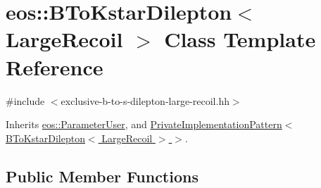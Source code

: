 \hypertarget{classeos_1_1BToKstarDilepton_3_01LargeRecoil_01_4}{
\section{eos::BToKstarDilepton$<$ LargeRecoil $>$ Class Template Reference}
\label{classeos_1_1BToKstarDilepton_3_01LargeRecoil_01_4}
}


{\ttfamily \#include $<$exclusive-\/b-\/to-\/s-\/dilepton-\/large-\/recoil.hh$>$}

Inherits \hyperlink{classeos_1_1ParameterUser}{eos::ParameterUser}, and \hyperlink{classeos_1_1PrivateImplementationPattern}{PrivateImplementationPattern$<$ BToKstarDilepton$<$ LargeRecoil $>$ $>$}.\subsection*{Public Member Functions}
